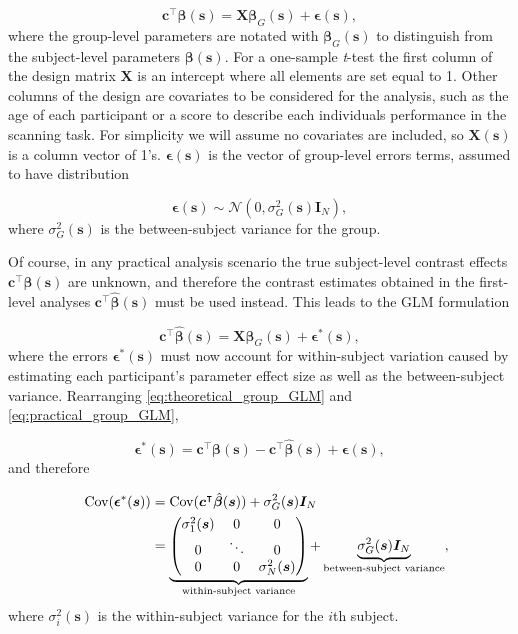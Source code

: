 \begin{equation}
\label{eq:theoretical_group_GLM}
\bm{c}^{\intercal}\bm{\beta}(\bm{s}) = \bm{X}\bm{\beta}_{G}(\bm{s}) + \bm{\epsilon}(\bm{s}),
\end{equation}
where the group-level parameters are notated with $\bm{\beta}_{G}(\bm{s})$ to distinguish from the subject-level parameters $\bm{\beta}(\bm{s})$. For a one-sample \textit{t}-test the first column of the design matrix $\bm{X}$ is an intercept where all elements are set equal to 1. Other columns of the design are covariates to be considered for the analysis, such as the age of each participant or a score to describe each individuals performance in the scanning task. For simplicity we will assume no covariates are included, so $\bm{X}(\bm{s})$ is a column vector of 1's. $\bm{\epsilon}(\bm{s})$ is the vector of group-level errors terms, assumed to have distribution

\begin{equation}
\label{eq:group_errors}
\bm{\epsilon}(\bm{s}) \sim  \mathcal{N}(0, \sigma_{G}^{2}(\bm{s})\bm{I}_{N}),
\end{equation}
where $\sigma_{G}^{2}(\bm{s})$ is the between-subject variance for the group. 

Of course, in any practical analysis scenario the true subject-level contrast effects $\bm{c}^{\intercal}\bm{\beta}(\bm{s})$ are unknown, and therefore the contrast estimates obtained in the first-level analyses $\bm{c}^{\intercal}\hat{\bm{\beta}}(\bm{s})$ must be used instead. This leads to the GLM formulation

\begin{equation} 
\label{eq:practical_group_GLM}
\bm{c}^{\intercal}\hat{\bm{\beta}}(\bm{s}) = \bm{X}\bm{\beta}_{G}(\bm{s}) + \bm{\epsilon}^{*}(\bm{s}),
\end{equation}
where the errors $\bm{\epsilon}^{*}(\bm{s})$ must now account for within-subject variation caused by estimating each participant's parameter effect size as well as the between-subject variance. Rearranging \ref{eq:theoretical_group_GLM} and \ref{eq:practical_group_GLM}, 

\begin{equation} 
\label{eq:practical_group_errors}
\bm{\epsilon}^{*}(\bm{s}) = \bm{c}^{\intercal}\bm{\beta}(\bm{s}) - \bm{c}^{\intercal}\hat{\bm{\beta}}(\bm{s}) + \bm{\epsilon}(\bm{s}),
\end{equation}
and therefore

\begin{alignat}{4}
\label{group_error_covariance}
&&\mathrm{Cov}(\bm{\epsilon}^{*}(\bm{s}))
&= \mathrm{Cov}(\bm{c}^{\intercal}\hat{\bm{\beta}}(\bm{s})) + \sigma_{G}^{2}(\bm{s})\bm{I}_{N} \notag\\
&
&
&= \underbrace{\begin{pmatrix}
\sigma_{1}^{2}(\bm{s}) & 0 & 0 \\
0 & \ddots & 0 \\
0 & 0 & \sigma_{N}^{2}(\bm{s})
\end{pmatrix}}_{\text{within-subject variance}}
+ \underbrace{\sigma_{G}^{2}(\bm{s})\bm{I}_{N}}_{\text{between-subject variance}},
\end{alignat}
where $\sigma_{i}^{2}(\bm{s})$ is the within-subject variance for the $i$th subject. 

